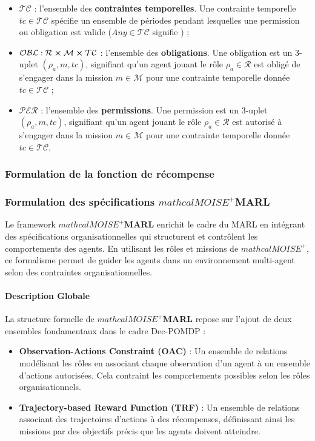 \documentclass[sigconf,anonymous]{aamas}
\begin{document}
\begin{itemize}
    \item $\mathcal{TC}$ : l'ensemble des \textbf{contraintes temporelles}. Une contrainte temporelle $tc \in \mathcal{TC}$ spécifie un ensemble de périodes pendant lesquelles une permission ou obligation est valide ($Any \in \mathcal{TC}$ signifie ) ;
    \item $\mathcal{OBL} : \mathcal{R} \cross \mathcal{M} \cross \mathcal{TC}$ : l'ensemble des \textbf{obligations}. Une obligation est un 3-uplet $(\rho_a, m, tc)$, signifiant qu'un agent jouant le rôle $\rho_a \in \mathcal{R}$ est obligé de s'engager dans la mission $m \in \mathcal{M}$ pour une contrainte temporelle donnée $tc \in \mathcal{TC}$ ;
    \item $\mathcal{PER}$ : l'ensemble des \textbf{permissions}. Une permission est un 3-uplet $(\rho_a, m, tc)$, signifiant qu'un agent jouant le rôle $\rho_a \in \mathcal{R}$ est autorisé à s'engager dans la mission $m \in \mathcal{M}$ pour une contrainte temporelle donnée $tc \in \mathcal{TC}$.
\end{itemize}


\subsubsection{Formulation de la fonction de récompense}

\subsubsection{Formulation des spécifications $mathcal{M}OISE^+$MARL}




Le framework \textbf{$mathcal{M}OISE^+$MARL} enrichit le cadre du MARL en intégrant des spécifications organisationnelles qui structurent et contrôlent les comportements des agents. En utilisant les rôles et missions de \textbf{$mathcal{M}OISE^+$}, ce formalisme permet de guider les agents dans un environnement multi-agent selon des contraintes organisationnelles.

\paragraph{Description Globale}

La structure formelle de \textbf{$mathcal{M}OISE^+$MARL} repose sur l'ajout de deux ensembles fondamentaux dans le cadre Dec-POMDP : 

\begin{itemize}
    \item \textbf{Observation-Actions Constraint (OAC)} : Un ensemble de relations modélisant les rôles en associant chaque observation d'un agent à un ensemble d'actions autorisées. Cela contraint les comportements possibles selon les rôles organisationnels.
    \item \textbf{Trajectory-based Reward Function (TRF)} : Un ensemble de relations associant des trajectoires d'actions à des récompenses, définissant ainsi les missions par des objectifs précis que les agents doivent atteindre.
\end{itemize}
\end{document}
